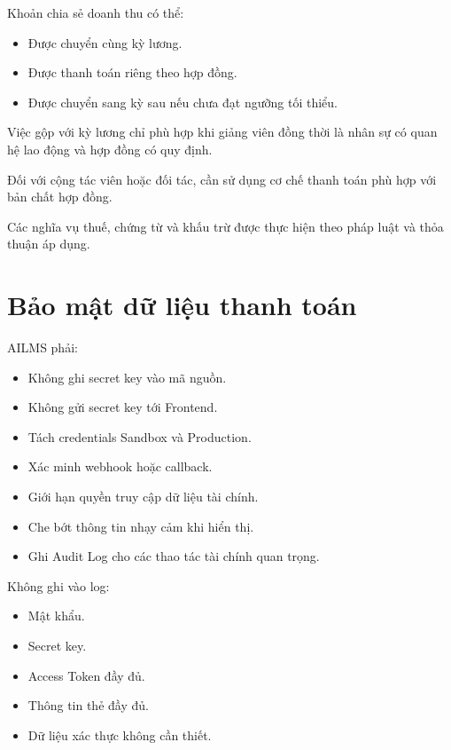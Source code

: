 \documentclass[12pt,a4paper]{article}
\begin{document}
Khoản chia sẻ doanh thu có thể:

\begin{itemize}
    \item Được chuyển cùng kỳ lương.
    \item Được thanh toán riêng theo hợp đồng.
    \item Được chuyển sang kỳ sau nếu chưa đạt ngưỡng tối thiểu.
\end{itemize}

Việc gộp với kỳ lương chỉ phù hợp khi giảng viên
đồng thời là nhân sự có quan hệ lao động và hợp đồng có quy định.

Đối với cộng tác viên hoặc đối tác,
cần sử dụng cơ chế thanh toán phù hợp với bản chất hợp đồng.

Các nghĩa vụ thuế, chứng từ và khấu trừ
được thực hiện theo pháp luật và thỏa thuận áp dụng.

\section{Bảo mật dữ liệu thanh toán}

AILMS phải:

\begin{itemize}
    \item Không ghi secret key vào mã nguồn.
    \item Không gửi secret key tới Frontend.
    \item Tách credentials Sandbox và Production.
    \item Xác minh webhook hoặc callback.
    \item Giới hạn quyền truy cập dữ liệu tài chính.
    \item Che bớt thông tin nhạy cảm khi hiển thị.
    \item Ghi Audit Log cho các thao tác tài chính quan trọng.
\end{itemize}

Không ghi vào log:

\begin{itemize}
    \item Mật khẩu.
    \item Secret key.
    \item Access Token đầy đủ.
    \item Thông tin thẻ đầy đủ.
    \item Dữ liệu xác thực không cần thiết.
\end{itemize}
\end{document}
